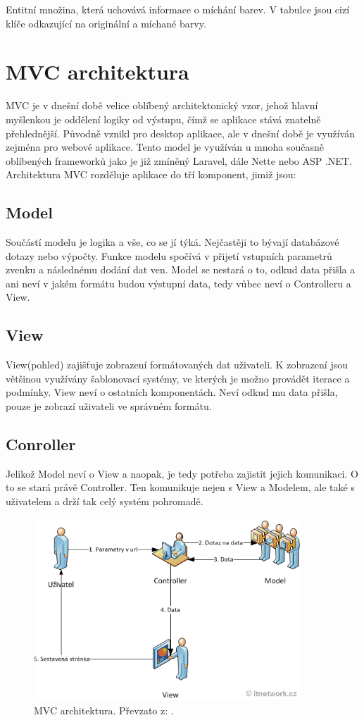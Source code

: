 Entitní množina, která uchovává informace o míchání barev. V tabulce jsou cizí klíče odkazující na originální a míchané barvy.

\section{MVC architektura}

MVC je v dnešní době velice oblíbený architektonický vzor, jehož hlavní myšlenkou je oddělení logiky od výstupu, čímž se aplikace stává znatelně přehlednější. Původně vznikl pro desktop aplikace, ale v dnešní době je využíván zejména pro webové aplikace. Tento model je využíván u mnoha současně oblíbených frameworků jako je již zmíněný Laravel, dále Nette nebo ASP .NET.
Architektura MVC rozděluje aplikace do tří komponent, jimiž jsou: \cite{mvc}


\subsection*{Model}
 Součástí modelu je logika a vše, co se jí týká. Nejčastěji to bývají databázové dotazy nebo výpočty. Funkce modelu spočívá v přijetí vstupních parametrů zvenku a následnému dodání dat ven. Model se nestará o to, odkud data přišla a ani neví v jakém formátu budou výstupní data, tedy vůbec neví o Controlleru a View. \cite{mvc}

\subsection*{View}
View(pohled) zajišťuje zobrazení formátovaných dat uživateli. K zobrazení jsou většinou využívány šablonovací systémy, ve kterých je možno provádět iterace a podmínky. View neví o ostatních komponentách. Neví odkud mu data přišla, pouze je zobrazí uživateli ve správném formátu. \cite{mvc}

\subsection*{Conroller}
Jelikož Model neví o View a naopak, je tedy potřeba zajistit jejich komunikaci. O to se stará právě Controller. Ten komunikuje nejen s View a Modelem, ale také s uživatelem a drží tak celý systém pohromadě. \cite{mvc}

\begin{figure}[H]
    \centering
    \includegraphics[width=100mm]{obrazky-figures/mvc-itnetwork.png}
    
    \caption{MVC architektura. Převzato z: \cite{mvcimage}.}
\end{figure}


